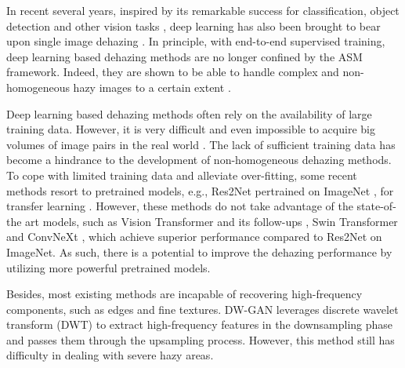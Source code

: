 \documentclass[10pt,twocolumn,letterpaper]{article}
\begin{document}
In recent several years, inspired by its remarkable success for classification, object detection and other vision tasks \cite{GAN,Res2Net,objectreview}, deep learning has also been brought to bear upon single image dehazing \cite{fusion,ntire2021,ntire2020,ntire2019,ntire2018,dehazing-deraining,contrast2022,frequencydehazing2022,Liu_2019_ICCV,Liu_2022_ITS}. In principle, with end-to-end supervised training, deep learning based dehazing methods are no longer confined by the ASM framework. Indeed, they are shown to be able to handle complex and non-homogeneous hazy images to a certain extent \cite{ntire2021,ntire2020}.


Deep learning based dehazing methods often rely on the availability of large training data. However, it is very difficult and even impossible to acquire big volumes of image pairs in the real world \cite{DW-GAN}. The lack of sufficient training data has become a hindrance to the development of non-homogeneous dehazing methods. To cope with limited training data and alleviate over-fitting, some recent methods \cite{ntire2020,ntire2021,DW-GAN} resort to pretrained models, e.g., Res2Net pertrained on ImageNet \cite{Res2Net,Imagenet}, for transfer learning \cite{transfer-learning1}. However, these methods do not take advantage of the state-of-the art models, such as Vision Transformer \cite{VisionTransformer} and its follow-ups \cite{ViT-followup1,ViT-followup2}, Swin Transformer \cite{Swin-T} and ConvNeXt \cite{convnext,convnext2}, which achieve superior performance compared to Res2Net on ImageNet. As such, there is a potential to improve the dehazing performance by utilizing more powerful pretrained models.



Besides, most existing methods are incapable of recovering high-frequency components, such as edges and fine textures. DW-GAN \cite{DW-GAN} leverages discrete wavelet transform (DWT) to extract high-frequency features in the downsampling phase and passes them through the upsampling process. However, this method still has difficulty in dealing with severe hazy areas.
\end{document}
